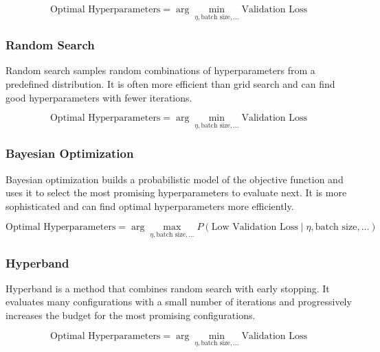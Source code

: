 \documentclass{report}
\begin{document}
        \begin{equation}
        \text{Optimal Hyperparameters} = \arg \min_{\eta, \text{batch size}, \ldots} \text{Validation Loss}
        \end{equation}
        
        \subsubsection{Random Search}
        
        Random search samples random combinations of hyperparameters from a predefined distribution. It is often more efficient than grid search and can find good hyperparameters with fewer iterations.
        
        \begin{equation}
        \text{Optimal Hyperparameters} = \arg \min_{\eta, \text{batch size}, \ldots} \text{Validation Loss}
        \end{equation}
        
        \subsubsection{Bayesian Optimization}
        
        Bayesian optimization builds a probabilistic model of the objective function and uses it to select the most promising hyperparameters to evaluate next. It is more sophisticated and can find optimal hyperparameters more efficiently.
        
        \begin{equation}
        \text{Optimal Hyperparameters} = \arg \max_{\eta, \text{batch size}, \ldots} P(\text{Low Validation Loss} \mid \eta, \text{batch size}, \ldots)
        \end{equation}
        
        \subsubsection{Hyperband}
        
        Hyperband is a method that combines random search with early stopping. It evaluates many configurations with a small number of iterations and progressively increases the budget for the most promising configurations.
        
        \begin{equation}
        \text{Optimal Hyperparameters} = \arg \min_{\eta, \text{batch size}, \ldots} \text{Validation Loss}
        \end{equation}
        
\end{document}
